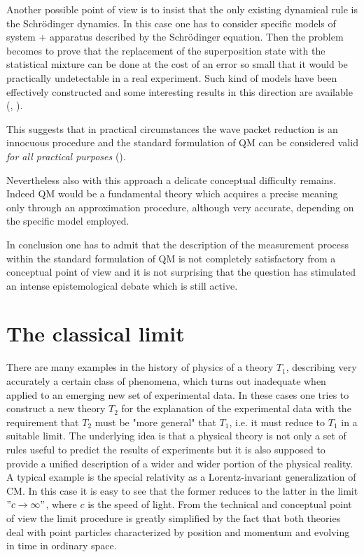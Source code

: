 \documentclass[12pt,reqno]{amsart}
\newcommand{\n}{\relax}
\newcommand{\vs}{\vspace{0.5cm}}
\numberwithin{equation}{section}
\begin{document}
\n
Another possible point of view is to insist that the only existing dynamical rule is the Schr\"{o}dinger dynamics. In this case one has to consider specific models of system + apparatus described by the Schr\"{o}dinger equation. Then the problem becomes to prove that the replacement of the superposition state with the statistical mixture can be done at the cost of an error so small that it would be practically undetectable in a real experiment. Such kind of models have been effectively constructed and some interesting results in this direction are available (\cite{he}, \cite{se}).

\n
This suggests that in practical circumstances the wave packet reduction is an innocuous procedure and  the standard formulation of QM can be considered valid {\em for all practical purposes} (\cite{b}). 

\n
Nevertheless also with this approach  a delicate conceptual difficulty remains.  Indeed QM would be a fundamental theory which acquires a precise meaning only through an approximation procedure, although very accurate, depending on the specific model employed.

\n
In conclusion one has to admit that the description of the measurement process within the standard formulation of QM is not completely satisfactory 
from a conceptual point of view and it is not surprising that the question has stimulated an   intense epistemological debate  which is still active.




















\vs
\vs
\section{The classical limit}

\vs
\n
There are many examples in  the history of physics of a theory $T_1$, describing very  accurately a certain class of phenomena, which turns out inadequate when applied to an emerging new set of experimental data. In these cases one tries to construct a new theory $T_2$ for the explanation of the experimental data with the  requirement  that $T_2$ must be "more general" that $T_1$, i.e. it must  reduce to $T_1$  in a suitable limit. The underlying idea is that  a physical theory is not only a set of rules useful to predict the results of experiments but it is also supposed to provide a  unified description of a wider and wider portion  of the physical reality. 
A typical example is the special relativity as a Lorentz-invariant  generalization of CM. In this case it is easy to see that the former reduces to the latter in the limit $" c \rightarrow \infty"$, where $c$ is the speed of light. From the technical and conceptual point of view the limit procedure is greatly simplified  by the fact that both theories deal with  point particles  characterized by position and momentum and evolving in time in ordinary space. 
\end{document}
